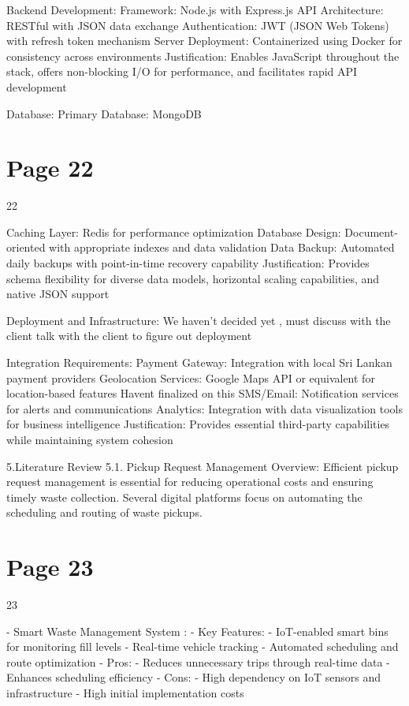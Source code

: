 \documentclass{article}
\begin{document}
  Backend Development: 
     Framework: Node.js with Express.js 
     API Architecture: RESTful with JSON data exchange 
     Authentication: JWT (JSON Web Tokens) with refresh token mechanism 
     Server Deployment: Containerized using Docker for consistency across environments 
     Justification: Enables JavaScript throughout the stack, offers non-blocking I/O for 
performance, and facilitates rapid API development 
 
  Database: 
     Primary Database: MongoDB 

\section*{Page 22}
   
 
 22  
 
     Caching Layer: Redis for performance optimization 
     Database Design: Document-oriented with appropriate indexes and data validation 
     Data Backup: Automated daily backups with point-in-time recovery capability 
     Justification: Provides schema flexibility for diverse data models, horizontal scaling 
capabilities, and native JSON support 
 
  Deployment and Infrastructure: 
We haven’t decided yet , must discuss with the client talk with the client to figure out 
deployment  
 
  Integration Requirements: 
Payment Gateway: Integration with local Sri Lankan payment providers 
Geolocation Services: Google Maps API or equivalent for location-based features  Havent   
finalized on this 
SMS/Email: Notification services for alerts and communications 
Analytics: Integration with data visualization tools for business intelligence 
Justification: Provides essential third-party capabilities while maintaining system cohesion 
 
 
5.Literature Review 
5.1. Pickup Request Management 
Overview: 
Efficient pickup request management is essential for reducing operational costs and ensuring 
timely waste collection. Several digital platforms focus on automating the scheduling and 
routing of waste pickups. 
 

\section*{Page 23}
   
 
 23  
 
- Smart Waste Management System : 
  - Key Features: 
    - IoT-enabled smart bins for monitoring fill levels   
    - Real-time vehicle tracking   
    - Automated scheduling and route optimization   
  - Pros: 
    - Reduces unnecessary trips through real-time data   
    - Enhances scheduling efficiency   
  - Cons: 
    - High dependency on IoT sensors and infrastructure   
    - High initial implementation costs 
 
\end{document}
